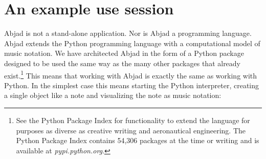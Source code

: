 \documentclass{article}
\begin{document}

\section{An example use session} \label{sec:example}

Abjad is not a stand-alone application. Nor is Abjad a programming language.
Abjad extends the Python programming language with a computational model of music notation.
We have architected Abjad in the form of a Python package designed to be used the same
way as the many other packages that already exist.\footnote{See the
Python Package Index for functionality to extend the language for purposes as
diverse as creative writing and aeronautical engineering. The Python Package
Index contains 54,306 packages at the time or writing and is available at
\textit{pypi.python.org}.}
This means that working with Abjad is exactly the same as working with Python.
In the simplest case this means starting the Python interpreter, creating a single object like a note and visualizing the note as music notation:
\end{document}
